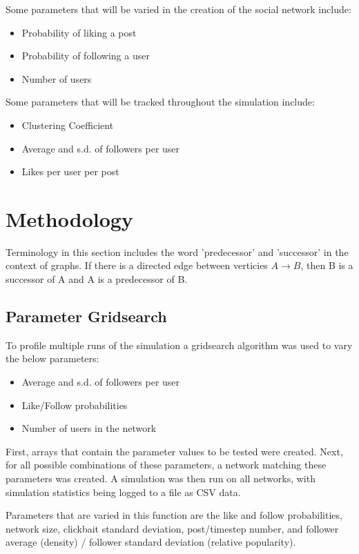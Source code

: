 \documentclass{article}
\begin{document}
Some parameters that will be varied in the creation of the social network include:
\begin{itemize}
    \item Probability of liking a post
    \item Probability of following a user
    \item Number of users
\end{itemize}

Some parameters that will be tracked throughout the simulation include:
\begin{itemize}
    \item Clustering Coefficient
    \item Average and s.d. of followers per user
    \item Likes per user per post
\end{itemize}

\section{Methodology}

Terminology in this section includes the word 'predecessor' and 'successor'
in the context of graphs. If there is a directed edge between verticies
$A \rightarrow B$, then B is a successor of A and A is a predecessor of B.

\subsection{Parameter Gridsearch}

To profile multiple runs of the simulation a gridsearch algorithm was used
to vary the below parameters:
\begin{itemize}
\item Average and s.d. of followers per user
\item Like/Follow probabilities
\item Number of users in the network
\end{itemize}

First, arrays that contain the parameter values to be tested were created.
Next, for all possible combinations of these parameters, a network
matching these parameters was created. A simulation was then run on all networks,
with simulation statistics being logged to a file as CSV data.

Parameters that are varied in this function are the like and follow probabilities,
network size, clickbait standard deviation, post/timestep number, and
follower average (density) / follower standard deviation (relative popularity).
\end{document}
